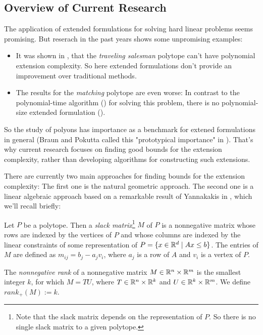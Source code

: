\subsection{Overview of Current Research}

The application of extended formulations for solving hard linear problems seems promising. But reserach in the past years shows some unpromising examples:
\begin{itemize}
  \item It was shown in \cite{fiorini2015exponential}, that the \textit{traveling salesman} polytope can't have polynomial extension complexity. So here extended formulations don't provide an improvement over traditional methods.
  \item The results for the \textit{matching} polytope are even worse: In contrast to the polynomial-time algorithm (\cite{ford1956maximal}) for solving this problem, there is no polynomial-size extended formulation (\cite{rothvoss2017matching}).
\end{itemize}

So the study of polyons has importance as a benchmark for extened formulations in general (Braun and Pokutta called this "prototypical importance" in \cite{braun2015matching}).
That's why current research focuses on finding good bounds for the extension complexity, rather than developing algorithms for constructing such extensions.

There are currently two main approaches for finding bounds for the extension complexity: The first one is the natural geometric approach. The second one is a linear algebraic approach based on a remarkable result of Yannakakis in \cite{yannakakis1991expressing}, which we'll recall briefly:

\begin{definition}
  Let $P$ be a polytope.
  Then a \textit{slack matrix}\footnote{Note that the slack matrix depends on the representation of $P$. So there is no single slack matrix to a given polytope.} $M$ of $P$ is a nonnegative matrix whose rows are indexed by the vertices of $P$ and whose columns are indexed by the linear constraints of some representation of $P=\{x \in \mathbb{R}^d \mid Ax \leq b\}$. 
  The entries of $M$ are defined as $m_{ij} = b_j - a_j v_i$, where $a_j$ is a row of $A$ and $v_i$ is a vertex of $P$.
\end{definition}

\begin{definition}
  The \textit{nonnegative rank} of a nonnegative matrix $M \in \mathbb{R}^n \times \mathbb{R}^m$ is the smallest integer $k$, for which $M = TU$, where $T \in \mathbb{R}^n \times \mathbb{R}^k$ and $U \in \mathbb{R}^k \times \mathbb{R}^m$.
  We define $rank_+(M) := k$.
\end{definition}

